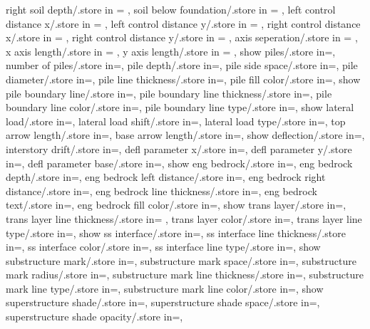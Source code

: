 {  right soil depth/.store in = \rightsoildepth,
  soil below foundation/.store in = \soilbelowfound,
  left control distance x/.store in = \leftcontrolx,
  left control distance y/.store in = \leftcontroly,
  right control distance x/.store in = \rightcontrolx,
  right control distance y/.store in = \rightcontroly,
  axis seperation/.store in = \axisseperation,
  x axis length/.store in = \axeslenX,
  y axis length/.store in = \axeslenY,
  show piles/.store in=\showpiles,
  number of piles/.store in=\numberofpiles,
  pile depth/.store in=\piledepth,
  pile side space/.store in=\pilesidespace,
  pile diameter/.store in=\pilediameter,
  pile line thickness/.store in=\pilelinethickness,
  pile fill color/.store in=\pilefillcolor,
  show pile boundary line/.store in=\showpbline,
  pile boundary line thickness/.store in=\pblinet,
  pile boundary line color/.store in=\pblinecolor,
  pile boundary line type/.store in=\pblinetype,
  show lateral load/.store in=\showlatload,
  lateral load shift/.store in=\latloadshift,
  lateral load type/.store in=\latloadtype,
  top arrow length/.store in=\toparrlen,
  base arrow length/.store in=\basearrlen,
  show deflection/.store in=\showdefl, 
  interstory drift/.store in=\drift,
  defl parameter x/.store in=,
  defl parameter y/.store in=,
  defl parameter base/.store in=,
  show eng bedrock/.store in=\showengbedrock,
  eng bedrock depth/.store in=\engbedrockdepth,
  eng bedrock left distance/.store in=\engbedrockleftdist,
  eng bedrock right distance/.store in=\engbedrockrightdist,
  eng bedrock line thickness/.store in=\engbedrocklinewidth,
  eng bedrock text/.store in=\engbedrocktext,
  eng bedrock fill color/.store in=\engbedrockfillcolor,
  show trans layer/.store in=\showtranslayer,
  trans layer line thickness/.store in= \translayerlinet,
  trans layer color/.store in=\translayercolor,
  trans layer line type/.store in=\translayerlinetype,
  show ss interface/.store in=\showssinter,
  ss interface line thickness/.store in=\ssinterlinet,
  ss interface color/.store in=\ssintercolor,
  ss interface line type/.store in=\ssinterlinetype,
  show substructure mark/.store in=\showmarkss,
  substructure mark space/.store in=\markssexspace,
  substructure mark radius/.store in=\markssrad,
  substructure mark line thickness/.store in=\marksslinet,
  substructure mark line type/.store in=\marksslinetype,
  substructure mark line color/.store in=\marksslinecolor,
  show superstructure shade/.store in=\showsupershade,
  superstructure shade space/.store in=\supershadespace,
  superstructure shade opacity/.store in=\supershadeopacity,
}
